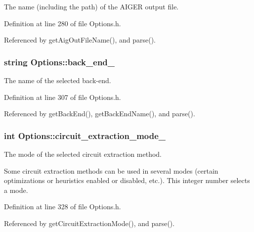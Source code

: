 The name (including the path) of the A\-I\-G\-E\-R output file. 



Definition at line 280 of file Options.\-h.



Referenced by get\-Aig\-Out\-File\-Name(), and parse().

\hypertarget{classOptions_ab049675ae9fd3fc7693dfa53266da8c8}{
\subsubsection[{back\-\_\-end\-\_\-}]{\setlength{\rightskip}{0pt plus 5cm}string Options\-::back\-\_\-end\-\_\-\hspace{0.3cm}{\ttfamily [protected]}}}\label{classOptions_ab049675ae9fd3fc7693dfa53266da8c8}


The name of the selected back-\/end. 



Definition at line 307 of file Options.\-h.



Referenced by get\-Back\-End(), get\-Back\-End\-Name(), and parse().

\hypertarget{classOptions_a8fc8a1d275e31a687c692ebdcfcef92f}{
\subsubsection[{circuit\-\_\-extraction\-\_\-mode\-\_\-}]{\setlength{\rightskip}{0pt plus 5cm}int Options\-::circuit\-\_\-extraction\-\_\-mode\-\_\-\hspace{0.3cm}{\ttfamily [protected]}}}\label{classOptions_a8fc8a1d275e31a687c692ebdcfcef92f}


The mode of the selected circuit extraction method. 

Some circuit extraction methods can be used in several modes (certain optimizations or heuristics enabled or disabled, etc.). This integer number selects a mode. 

Definition at line 328 of file Options.\-h.



Referenced by get\-Circuit\-Extraction\-Mode(), and parse().

